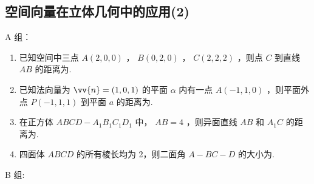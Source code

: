 \begin{enumerate}
\begin{jieda}
\begin{enumerate}
        \end{enumerate}
    \end{jieda}

\end{enumerate}





\subsection*{空间向量在立体几何中的应用(2)}

A 组：

\begin{enumerate}

    \item 已知空间中三点 $A\left( {2,0,0}\right)$ ， $B\left( {0,2,0}\right)$ ， $C\left( {2,2,2}\right)$ ，则点 $C$ 到直线 ${AB}$ 的距离为.

    \item 已知法向量为 $\vv{n} = \left( {1,0,1}\right)$ 的平面 $\alpha$ 内有一点 $A\left( {-1,1,0}\right)$ ，则平面外点 $P\left( {-1,1,1}\right)$ 到平面 $a$ 的距离为.

    \item 在正方体 ${ABCD} - {A}_{1}{B}_{1}{C}_{1}{D}_{1}$ 中， ${AB} = 4$ ，则异面直线 ${AB}$ 和 ${A}_{1}C$ 的距离为.

    \item 四面体 ${ABCD}$ 的所有棱长均为 2，则二面角 $A - {BC} - D$ 的大小为.


\end{enumerate}

B 组:

